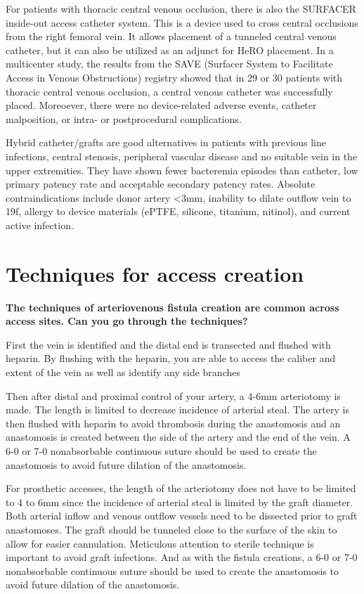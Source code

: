 \documentclass[
]{book}
\begin{document}
For patients with thoracic central venous occlusion, there is also the
SURFACER inside-out access catheter system. This is a device used to
cross central occlusions from the right femoral vein. It allows
placement of a tunneled central venous catheter, but it can also be
utilized as an adjunct for HeRO placement. In a multicenter study, the
results from the SAVE (Surfacer System to Facilitate Access in Venous
Obstructions) registry showed that in 29 or 30 patients with thoracic
central venous occlusion, a central venous catheter was successfully
placed. Moreoever, there were no device-related adverse events, catheter
malposition, or intra- or postprocedural complications. \citep{gallieni2020}

Hybrid catheter/grafts are good alternatives in patients with previous
line infections, central stenosis, peripheral vascular disease and no
suitable vein in the upper extremities. They have shown fewer bacteremia
episodes than catheter, low primary patency rate and acceptable
secondary patency rates.\citep{alshakarchi2015} Absolute contraindications
include donor artery \textless3mm, inability to dilate outflow vein to 19f,
allergy to device materials (ePTFE, silicone, titanium, nitinol), and
current active infection.\citep{meritmedical}

\hypertarget{techniques-for-access-creation}{%
\section{Techniques for access creation}\label{techniques-for-access-creation}}

\textbf{The techniques of arteriovenous fistula creation are common across
access sites. Can you go through the techniques?}

First the vein is identified and the distal end is transected and
flushed with heparin. By flushing with the heparin, you are able to
access the caliber and extent of the vein as well as identify any side
branches

Then after distal and proximal control of your artery, a 4-6mm
arteriotomy is made. The length is limited to decrease incidence of
arterial steal. The artery is then flushed with heparin to avoid
thrombosis during the anastomosis and an anastomosis is created between
the side of the artery and the end of the vein. A 6-0 or 7-0
nonabsorbable continuous suture should be used to create the anastomosis
to avoid future dilation of the anastomosis.

For prosthetic accesses, the length of the arteriotomy does not have to
be limited to 4 to 6mm since the incidence of arterial steal is limited
by the graft diameter. Both arterial inflow and venous outflow vessels
need to be dissected prior to graft anastomoses. The graft should be
tunneled close to the surface of the skin to allow for easier
cannulation. Meticulous attention to sterile technique is important to
avoid graft infections. And as with the fistula creations, a 6-0 or 7-0
nonabsorbable continuous suture should be used to create the anastomosis
to avoid future dilation of the anastomosis.
\end{document}
